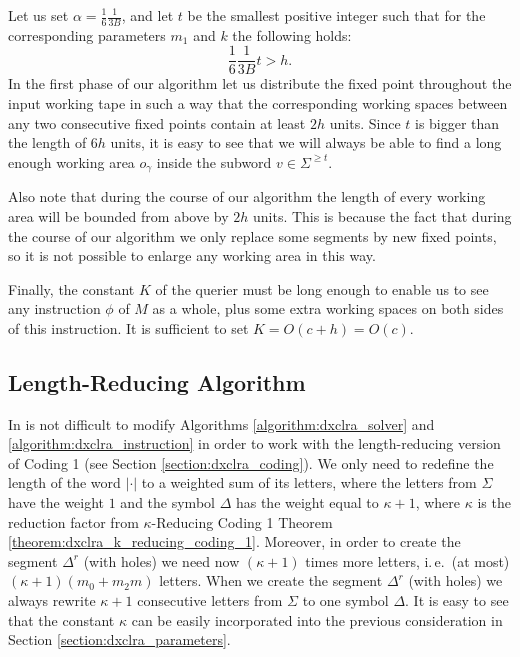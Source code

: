 Let us set $\alpha = \frac{1}{6} \frac{1}{3 B}$, and let $t$ be the smallest positive integer such that for the corresponding parameters $m_1$ and $k$ the following holds:
$$\frac{1}{6} \frac{1}{3 B} t > h.$$
In the first phase of our algorithm let us distribute the fixed point throughout the input working tape in such a way that the corresponding working spaces between any two consecutive fixed points contain at least $2h$ units. Since $t$ is bigger than the length of $6 h$ units, it is easy to see that we will always be able to find a long enough working area $o_{\gamma}$ inside the subword $v \in \Sigma^{\ge t}$.

Also note that during the course of our algorithm the length of every working area will be bounded from above by $2h$ units. This is because the fact that during the course of our algorithm we only replace some segments by new fixed points, so it is not possible to enlarge any working area in this way.

Finally, the constant $K$ of the querier must be long enough to enable us to see any instruction $\phi$ of $M$ as a whole, plus some extra working spaces on both sides of this instruction. It is sufficient to set $K = O(c + h) = O(c)$.

\subsection{Length-Reducing Algorithm}\label{section:dxclra_length-reducing}

In is not difficult to modify Algorithms \ref{algorithm:dxclra_solver} and \ref{algorithm:dxclra_instruction} in order to work with the length-reducing version of Coding 1 (see Section \ref{section:dxclra_coding}). We only need to redefine the length of the word $| \cdot |$ to a weighted sum of its letters, where the letters from $\Sigma$ have the weight $1$ and the symbol $\Delta$ has the weight equal to $\kappa + 1$, where $\kappa$ is the reduction factor from $\kappa$-Reducing Coding 1 Theorem \ref{theorem:dxclra_k_reducing_coding_1}. Moreover, in order to create the segment $\Delta^r$ (with holes) we need now $(\kappa + 1)$ times more letters, i.\,e.\ (at most) $(\kappa + 1) (m_0 + m_2 m)$ letters. When we create the segment $\Delta^r$ (with holes) we always rewrite $\kappa + 1$ consecutive letters from $\Sigma$ to one symbol $\Delta$. It is easy to see that the constant $\kappa$ can be easily incorporated into the previous consideration in Section \ref{section:dxclra_parameters}.

